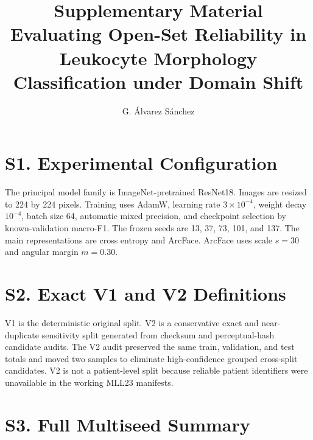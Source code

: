 \documentclass[11pt]{article}
\title{Supplementary Material\\Evaluating Open-Set Reliability in Leukocyte Morphology Classification under Domain Shift}
\author{G. Álvarez Sánchez}
\date{}
\begin{document}
\maketitle

\section*{S1. Experimental Configuration}

The principal model family is ImageNet-pretrained ResNet18. Images are resized to 224 by 224 pixels. Training uses AdamW, learning rate $3\times10^{-4}$, weight decay $10^{-4}$, batch size 64, automatic mixed precision, and checkpoint selection by known-validation macro-F1. The frozen seeds are 13, 37, 73, 101, and 137. The main representations are cross entropy and ArcFace. ArcFace uses scale $s=30$ and angular margin $m=0.30$.

\section*{S2. Exact V1 and V2 Definitions}

V1 is the deterministic original split. V2 is a conservative exact and near-duplicate sensitivity split generated from checksum and perceptual-hash candidate audits. The V2 audit preserved the same train, validation, and test totals and moved two samples to eliminate high-confidence grouped cross-split candidates. V2 is not a patient-level split because reliable patient identifiers were unavailable in the working MLL23 manifests.

\section*{S3. Full Multiseed Summary}
\end{document}
